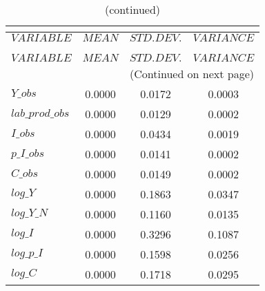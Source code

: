  
\begin{center}
\begin{longtable}{lccc} 
\caption{THEORETICAL MOMENTS}\\
 \label{Table:th_moments}\\
\toprule 
$VARIABLE        $	 & 	 $         MEAN$	 & 	 $    STD. DEV.$	 & 	 $     VARIANCE$\\
\midrule \endfirsthead 
\caption{(continued)}\\
 \toprule \\ 
$VARIABLE        $	 & 	 $         MEAN$	 & 	 $    STD. DEV.$	 & 	 $     VARIANCE$\\
\midrule \endhead 
\midrule \multicolumn{4}{r}{(Continued on next page)} \\ \bottomrule \endfoot 
\bottomrule \endlastfoot 
$Y\_obs          $	 & 	       0.0000	 & 	       0.0172	 & 	       0.0003 \\ 
$lab\_prod\_obs  $	 & 	       0.0000	 & 	       0.0129	 & 	       0.0002 \\ 
$I\_obs          $	 & 	       0.0000	 & 	       0.0434	 & 	       0.0019 \\ 
$p\_I\_obs       $	 & 	       0.0000	 & 	       0.0141	 & 	       0.0002 \\ 
$C\_obs          $	 & 	       0.0000	 & 	       0.0149	 & 	       0.0002 \\ 
$log\_Y          $	 & 	       0.0000	 & 	       0.1863	 & 	       0.0347 \\ 
$log\_Y\_N       $	 & 	       0.0000	 & 	       0.1160	 & 	       0.0135 \\ 
$log\_I          $	 & 	       0.0000	 & 	       0.3296	 & 	       0.1087 \\ 
$log\_p\_I       $	 & 	       0.0000	 & 	       0.1598	 & 	       0.0256 \\ 
$log\_C          $	 & 	       0.0000	 & 	       0.1718	 & 	       0.0295 \\ 
\end{longtable}
 \end{center}
